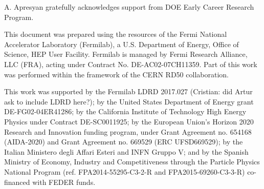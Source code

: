\documentclass[preprint,1p]{elsarticle}
\begin{document}
A. Apresyan gratefully acknowledges support from DOE Early Career Research Program.

This document was prepared using the resources of the Fermi National Accelerator
Laboratory (Fermilab), a U.S. Department of Energy, Office of Science, HEP User
Facility. Fermilab is managed by Fermi Research Alliance, LLC (FRA), acting
under Contract No. DE-AC02-07CH11359. Part of this work was performed within the
framework of the CERN RD50 collaboration.

This work was supported by the Fermilab LDRD 2017.027 {\color{red} (Cristian: did Artur ask to include LDRD here?)}; by the United States
Department of Energy grant DE-FG02-04ER41286; by the California Institute of
Technology High Energy Physics under Contract DE-SC0011925; by the European
Union's Horizon 2020 Research and Innovation funding program, under Grant
Agreement no. 654168 (AIDA-2020) and Grant Agreement no. 669529 (ERC
UFSD669529); by the Italian Ministero degli Affari Esteri and INFN Gruppo V; and
by the Spanish Ministry of Economy, Industry and Competitiveness through the
Particle Physics National Program (ref. FPA2014-55295-C3-2-R and
FPA2015-69260-C3-3-R) co-financed with FEDER funds.









{}





\end{document}
